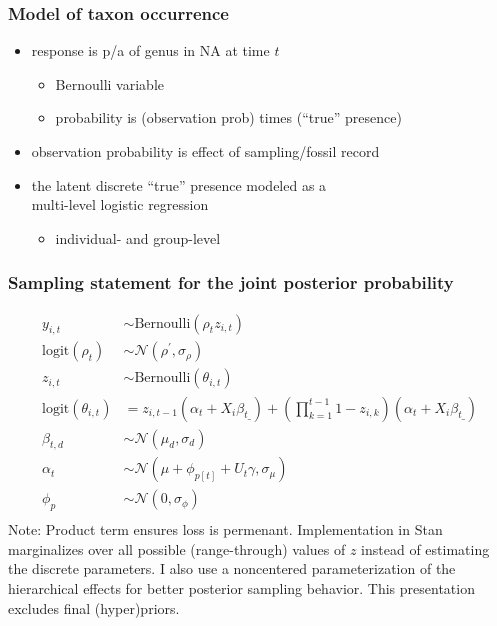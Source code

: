 \documentclass{beamer}
\begin{document}
\begin{frame}
  \frametitle{Model of taxon occurrence}
  \begin{itemize}
    \item response is p/a of genus in NA at time \(t\)
      \begin{itemize}
        \item Bernoulli variable 
        \item probability is (observation prob) times (``true'' presence)
      \end{itemize}
    \item observation probability is effect of sampling/fossil record
    \item the latent discrete ``true'' presence modeled as a \\multi-level logistic regression
      \begin{itemize}
        \item individual- and group-level
      \end{itemize}
  \end{itemize}
\end{frame}

\begin{frame}
  \frametitle{Sampling statement for the joint posterior probability}
  \footnotesize{
    \begin{align*}
      y_{i,t} &\sim \text{Bernoulli}(\rho_{t} z_{i,t}) \\
      \text{logit}(\rho_{t}) &\sim \mathcal{N}(\rho^{'}, \sigma_{\rho}) \\
      z_{i,t} &\sim \text{Bernoulli}(\theta_{i, t}) \\
      \text{logit}(\theta_{i, t}) &= z_{i,t-1} (\alpha_{t} + X_{i} \beta_{t\_}) + (\prod_{k = 1}^{t-1} 1 - z_{i,k}) (\alpha_{t} + X_{i} \beta_{t\_}) \\
      \beta_{t,d} &\sim \mathcal{N}(\mu_{d}, \sigma_{d}) \\
      \alpha_{t} &\sim \mathcal{N}(\mu + \phi_{p[t]} + U_{t} \gamma, \sigma_{\mu}) \\
      \phi_{p} &\sim \mathcal{N}(0, \sigma_{\phi}) \\
    \end{align*}
  }
  \scriptsize{Note: Product term ensures loss is permenant. Implementation in Stan marginalizes over all possible (range-through) values of \(z\) instead of estimating the discrete parameters. I also use a noncentered parameterization of the hierarchical effects for better posterior sampling behavior. This presentation excludes final (hyper)priors.}
\end{frame}
\end{document}
